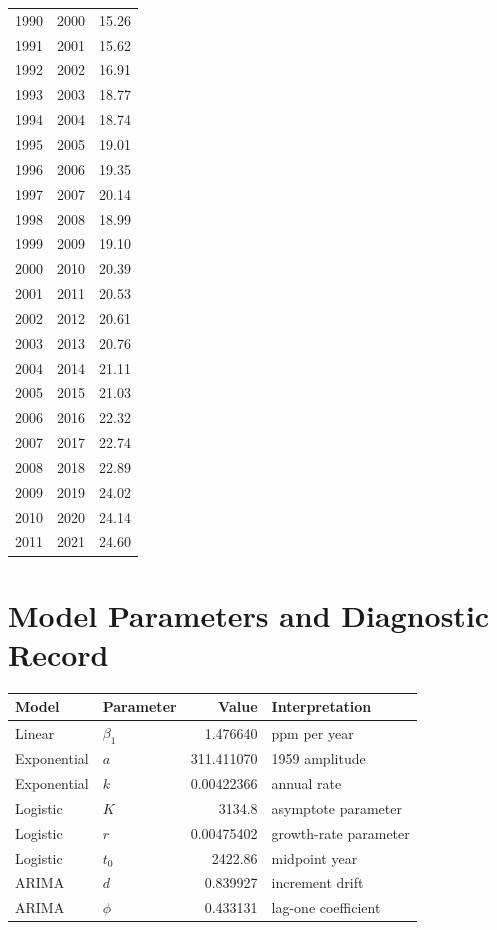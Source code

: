 \documentclass{mcmthesis}
\begin{document}
\begin{appendices}
\begin{longtable}{rrr}
1990 & 2000 & 15.26 \\
1991 & 2001 & 15.62 \\
1992 & 2002 & 16.91 \\
1993 & 2003 & 18.77 \\
1994 & 2004 & 18.74 \\
1995 & 2005 & 19.01 \\
1996 & 2006 & 19.35 \\
1997 & 2007 & 20.14 \\
1998 & 2008 & 18.99 \\
1999 & 2009 & 19.10 \\
2000 & 2010 & 20.39 \\
2001 & 2011 & 20.53 \\
2002 & 2012 & 20.61 \\
2003 & 2013 & 20.76 \\
2004 & 2014 & 21.11 \\
2005 & 2015 & 21.03 \\
2006 & 2016 & 22.32 \\
2007 & 2017 & 22.74 \\
2008 & 2018 & 22.89 \\
2009 & 2019 & 24.02 \\
2010 & 2020 & 24.14 \\
2011 & 2021 & 24.60 \\
\bottomrule
\end{longtable}

\section{Model Parameters and Diagnostic Record}

\begin{table}[H]
\centering
\small
\begin{tabularx}{\textwidth}{l l r X}
\toprule
Model & Parameter & Value & Interpretation \\ \midrule
\midrule
Linear & $\beta_1$ & 1.476640 & ppm per year \\
Exponential & $a$ & 311.411070 & 1959 amplitude \\
Exponential & $k$ & 0.00422366 & annual rate \\
Logistic & $K$ & 3134.8 & asymptote parameter \\
Logistic & $r$ & 0.00475402 & growth-rate parameter \\
Logistic & $t_0$ & 2422.86 & midpoint year \\
ARIMA & $d$ & 0.839927 & increment drift \\
ARIMA & $\phi$ & 0.433131 & lag-one coefficient \\
\bottomrule
\end{tabularx}
\end{table}


\end{appendices}
\end{document}
